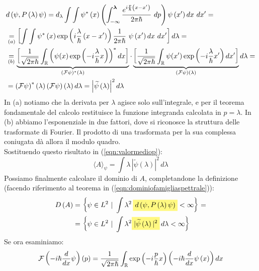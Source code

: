\documentclass[../../FisicaTeorica.tex]{subfiles}
\begin{document}
\begin{align*}
&d\left(\psi,P\left(\lambda\right)\psi\right)=d_\lambda\int \int \psi^*\left(x\right)
\left ( \int_{-\infty}^{\bm{\lambda}}\frac{e^{i\frac{p}{\hbar}\left(x-x'\right)}}{2\pi\hbar}\ dp\right )
\psi\left(x'\right)dx\ dx'=\\
&\underset{(a)}{=}\left[\int\int\psi^*\left(x\right)
\exp \left ({i\frac{\lambda}{\hbar}\left(x-x'\right)}\right ) \frac{1}{2\pi\hbar}\ \psi\left(x'\right)dx\ dx'\right]d\lambda =\\
&\underset{(b)}{=} \underbrace{\left [ \frac{1}{\sqrt{2\pi\hbar }}\int_\bb{R} \left ( \psi(x) \exp \left (-i\frac{\lambda}{\hbar}x\right )\right )^*dx \right ]}_{(\mathcal{F}\psi)^*(\lambda)}
\cdot 
\underbrace{\left [ \frac{1}{\sqrt{2\pi\hbar}} \int_\bb{R} \psi(x') \exp\left (-i\frac{\lambda}{\hbar}x'\right )dx' \right ]}_{(\mathcal{F}\psi)(\lambda)}
d\lambda =\\
&= \left(\mathcal{F}\psi\right)^*\left(\lambda\right)\left(\mathcal{F}\psi\right)\left(\lambda\right)d\lambda=\left|\widetilde{\psi}\left(\lambda\right)\right|^2d\lambda 
\end{align*}
In (a) notiamo che la derivata per $\lambda$ agisce solo sull'integrale, e per il teorema fondamentale del calcolo restituisce la funzione integranda calcolata in $p = \lambda$. In (b) abbiamo  l'esponenziale in due fattori, dove si riconosce la struttura delle trasformate di Fourier. Il prodotto di una trasformata per la sua complessa coniugata dà allora il modulo quadro.\\
Sostituendo questo risultato in (\ref{eqn:valormediop}):
\[
\langle A \rangle_\psi = \int \lambda\, |\tilde{\psi}(\lambda)|^2\, d\lambda
\]
Possiamo finalmente calcolare il dominio di $A$, completandone la definizione (facendo riferimento al teorema in (\ref{eqn:dominiofamigliaspettrale})):
\begin{align*}
D\left(A\right)&= \left\{\psi\in L^2\ |\ \int\lambda^2\, \hlc{Yellow}{d\left(\psi,P\left(\lambda\right)\psi\right)}<\infty\right\}=\\
&=\left\{\psi\in L^2\ |\ \int\lambda^2 \hlc{Yellow}{|\widetilde{\psi}\left(\lambda\right)|^2}\,d\lambda<\infty\right\} 
\end{align*}
Se ora esaminiamo:
\begin{equation}
\mathcal{F}\left(-i\hbar\frac{d}{dx}\psi\right)\left(p\right)=\frac{1}{\sqrt{2\pi\hbar}}\int_{\mathbb{R}} \exp\left (-i\frac{p}{\hbar}x\right )\left(-i\hbar\frac{d}{dx}\psi\left(x\right)\right)dx 
\label{eqn:trasformatap}
\end{equation}
\end{document}
